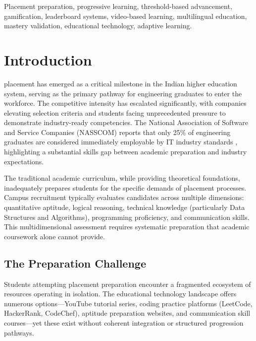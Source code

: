 \documentclass[journal]{IEEEtran}
\begin{document}
\begin{abstract}
Skill Forge demonstrates that structured progression with mastery validation significantly outperforms ad-hoc learning approaches, providing a scalable, technology-driven solution for closing the preparation gap between academic curricula and industry placement requirements.
\end{abstract}

\begin{IEEEkeywords}
Placement preparation, progressive learning, threshold-based advancement, gamification, leaderboard systems, video-based learning, multilingual education, mastery validation, educational technology, adaptive learning.
\end{IEEEkeywords}

\section{Introduction}

 placement has emerged as a critical milestone in the Indian higher education system, serving as the primary pathway for engineering graduates to enter the workforce. The competitive intensity has escalated significantly, with companies elevating selection criteria and students facing unprecedented pressure to demonstrate industry-ready competencies. The National Association of Software and Service Companies (NASSCOM) reports that only 25\% of engineering graduates are considered immediately employable by IT industry standards \cite{nasscom2024}, highlighting a substantial skills gap between academic preparation and industry expectations.

The traditional academic curriculum, while providing theoretical foundations, inadequately prepares students for the specific demands of placement processes. Campus recruitment typically evaluates candidates across multiple dimensions: quantitative aptitude, logical reasoning, technical knowledge (particularly Data Structures and Algorithms), programming proficiency, and communication skills. This multidimensional assessment requires systematic preparation that academic coursework alone cannot provide.

\subsection{The Preparation Challenge}

Students attempting placement preparation encounter a fragmented ecosystem of resources operating in isolation. The educational technology landscape offers numerous options---YouTube tutorial series, coding practice platforms (LeetCode, HackerRank, CodeChef), aptitude preparation websites, and communication skill courses---yet these exist without coherent integration or structured progression pathways.
\end{document}
